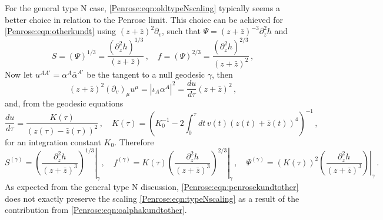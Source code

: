 For the general type N case, \eqref{Penrose:eqn:oldtypeNscaling} typically seems a better choice in relation to the Penrose limit. This choice can be achieved for \eqref{Penrose:eqn:otherkundt} using $\left(z+\bar{z}\right)^2\partial_v$, such that $\Psi =  (z+\bar{z})^{-3} \partial_z^2 h$ and 
\begin{equation}
S = (\Psi)^{1/3} = \frac{(\partial_z^2 h)^{1/3}}{(z+\bar{z})} \, , \quad f = (\Psi)^{2/3} = \frac{(\partial_z^2 h)^{2/3}}{(z+\bar{z})^2} \, ,
\end{equation}
Now let $u^{AA'} = \alpha^A \bar{\alpha}^{A'}$ be the tangent to a null geodesic $\gamma$, then
\begin{equation}\label{Penrose:eqn:oalphakundtother}
\left(z+\bar{z}\right)^2\left(\partial_v\right)_{\mu} u^{\mu}= |\iota_A \alpha^A|^2 = \frac{du}{d\tau} (z+\bar{z})^2 \, ,
\end{equation}
and, from the geodesic equations
\begin{equation}
\frac{du}{d\tau} = \frac{K(\tau)}{(z(\tau)-\bar{z}(\tau))^2} \, , \quad K(\tau) = \left(K^{-1}_0 - 2 \int_0^{\tau} dt \, v(t) (z(t)+\bar{z}(t))^4\right)^{-1} \, ,
\end{equation}
for an integration constant $K_0$. Therefore
\begin{equation}\label{Penrose:eqn:penrosekundtother}
S^{(\gamma)}  = \left. \left(\frac{\partial_z^2 h}{(z+\bar{z})^3}\right)^{1/3} \right|_{\gamma} \, , \quad f^{(\gamma)}  =  \left. K(\tau)\left(\frac{\partial_z^2 h}{(z+\bar{z})^3}\right)^{2/3} \right|_{\gamma}\, , \quad \Psi^{(\gamma)}  = \left. \left(K(\tau)\right)^2 \left(\frac{\partial_z^2 h}{(z+\bar{z})^3}\right)\right|_{\gamma} \, .
\end{equation}
As expected from the general type N discussion, \eqref{Penrose:eqn:penrosekundtother} does not exactly preserve the scaling \eqref{Penrose:eqn:typeNscaling} as a result of the contribution from \eqref{Penrose:eqn:oalphakundtother}.
